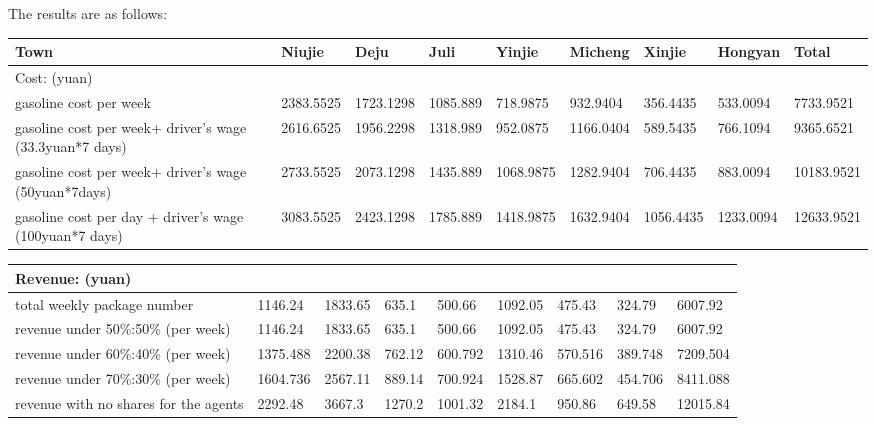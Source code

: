 \documentclass{article}
\begin{document}
\mbox{\hspace{2em}}
The results are as follows: \\
\begin{tabular}{|p{5.09em}|l|l|l|l|l|l|l|l|}
    \toprule
    Town  & \multicolumn{1}{p{3.06em}|}{Niujie} & \multicolumn{1}{p{3.06em}|}{Deju} & \multicolumn{1}{p{2.825em}|}{Juli} & \multicolumn{1}{p{3.12em}|}{Yinjie} & \multicolumn{1}{p{3.09em}|}{Micheng} & \multicolumn{1}{p{3.235em}|}{Xinjie} & \multicolumn{1}{p{3.175em}|}{Hongyan} & \multicolumn{1}{p{3.56em}|}{Total} \\
    \midrule
    Cost: (yuan) &       &       &       &       &       &       &       &  \\
    \midrule
    gasoline cost per week & 2383.5525 & 1723.1298 & 1085.889 & 718.9875 & 932.9404 & 356.4435 & 533.0094 & 7733.9521 \\
    \midrule
    gasoline cost per week+ driver's wage (33.3yuan*7 days) & 2616.6525 & 1956.2298 & 1318.989 & 952.0875 & 1166.0404 & 589.5435 & 766.1094 & 9365.6521 \\
    \midrule
    gasoline cost per week+ driver's wage (50yuan*7days) & 2733.5525 & 2073.1298 & 1435.889 & 1068.9875 & 1282.9404 & 706.4435 & 883.0094 & 10183.9521 \\
    \midrule
    gasoline cost per day + driver's wage (100yuan*7 days) & 3083.5525 & 2423.1298 & 1785.889 & 1418.9875 & 1632.9404 & 1056.4435 & 1233.0094 & 12633.9521 \\
    \bottomrule
    \end{tabular}%
 

\begin{tabular}{|p{5.09em}|l|l|l|l|l|l|l|l|}
    \toprule
    Revenue: (yuan) &       &       &       &       &       &       &       &  \\
    \midrule
    total weekly package number & 1146.24 & 1833.65 & 635.1 & 500.66 & 1092.05 & 475.43 & 324.79 & 6007.92 \\
    \midrule
    revenue under 50\%:50\% (per week) & 1146.24 & 1833.65 & 635.1 & 500.66 & 1092.05 & 475.43 & 324.79 & 6007.92 \\
    \midrule
    revenue under 60\%:40\% (per week) & 1375.488 & 2200.38 & 762.12 & 600.792 & 1310.46 & 570.516 & 389.748 & 7209.504 \\
    \midrule
    revenue under 70\%:30\% (per week) & 1604.736 & 2567.11 & 889.14 & 700.924 & 1528.87 & 665.602 & 454.706 & 8411.088 \\
    \midrule
    revenue with no shares for the agents & 2292.48 & 3667.3 & 1270.2 & 1001.32 & 2184.1 & 950.86 & 649.58 & 12015.84 \\
    \bottomrule
    \end{tabular}%
    
\end{document}
